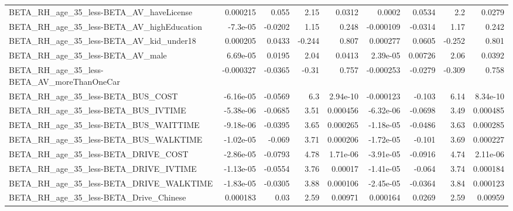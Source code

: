\begin{tabular}{lrrrrrrrr}
BETA\_RH\_age\_35\_less-BETA\_AV\_haveLicense            &    0.000215 &        0.055 &     2.15 &   0.0312 &     0.0002 &      0.0534 &          2.2 &        0.0279 \\
BETA\_RH\_age\_35\_less-BETA\_AV\_highEducation          &    -7.3e-05 &      -0.0202 &     1.15 &    0.248 &  -0.000109 &     -0.0314 &         1.17 &         0.242 \\
BETA\_RH\_age\_35\_less-BETA\_AV\_kid\_under18            &    0.000205 &       0.0433 &   -0.244 &    0.807 &   0.000277 &      0.0605 &       -0.252 &         0.801 \\
BETA\_RH\_age\_35\_less-BETA\_AV\_male                   &    6.69e-05 &       0.0195 &     2.04 &   0.0413 &   2.39e-05 &     0.00726 &         2.06 &        0.0392 \\
BETA\_RH\_age\_35\_less-BETA\_AV\_moreThanOneCar         &   -0.000327 &      -0.0365 &    -0.31 &    0.757 &  -0.000253 &     -0.0279 &       -0.309 &         0.758 \\
BETA\_RH\_age\_35\_less-BETA\_BUS\_COST                  &   -6.16e-05 &      -0.0569 &      6.3 & 2.94e-10 &  -0.000123 &      -0.103 &         6.14 &      8.34e-10 \\
BETA\_RH\_age\_35\_less-BETA\_BUS\_IVTIME                &   -5.38e-06 &      -0.0685 &     3.51 & 0.000456 &  -6.32e-06 &     -0.0698 &         3.49 &      0.000485 \\
BETA\_RH\_age\_35\_less-BETA\_BUS\_WAITTIME              &   -9.18e-06 &      -0.0395 &     3.65 & 0.000265 &  -1.18e-05 &     -0.0486 &         3.63 &      0.000285 \\
BETA\_RH\_age\_35\_less-BETA\_BUS\_WALKTIME              &   -1.02e-05 &       -0.069 &     3.71 & 0.000206 &  -1.72e-05 &      -0.101 &         3.69 &      0.000227 \\
BETA\_RH\_age\_35\_less-BETA\_DRIVE\_COST                &   -2.86e-05 &      -0.0793 &     4.78 & 1.71e-06 &  -3.91e-05 &     -0.0916 &         4.74 &      2.11e-06 \\
BETA\_RH\_age\_35\_less-BETA\_DRIVE\_IVTIME              &   -1.13e-05 &      -0.0554 &     3.76 &  0.00017 &  -1.41e-05 &      -0.064 &         3.74 &      0.000184 \\
BETA\_RH\_age\_35\_less-BETA\_DRIVE\_WALKTIME            &   -1.83e-05 &      -0.0305 &     3.88 & 0.000106 &  -2.45e-05 &     -0.0364 &         3.84 &      0.000123 \\
BETA\_RH\_age\_35\_less-BETA\_Drive\_Chinese             &    0.000183 &         0.03 &     2.59 &  0.00971 &   0.000164 &      0.0269 &         2.59 &       0.00959 \\

\end{tabular}
